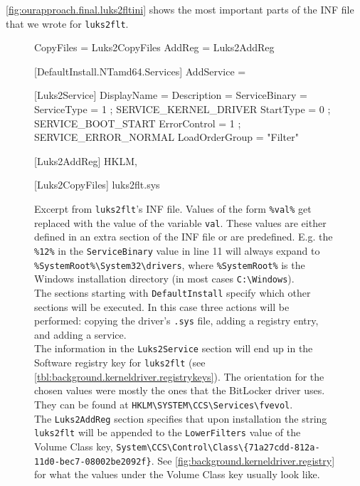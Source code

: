 \autoref{fig:ourapproach.final.luks2fltini} shows the most important parts of the INF file that we wrote for \texttt{luks2flt}.

\begin{figure}[htb!]
	\begin{inicode}
CopyFiles = Luks2CopyFiles
AddReg    = Luks2AddReg

[DefaultInstall.NTamd64.Services]
AddService = %

[Luks2Service]
DisplayName    = %
Description    = %
ServiceBinary  = %
ServiceType    = 1 ; SERVICE_KERNEL_DRIVER
StartType      = 0 ; SERVICE_BOOT_START
ErrorControl   = 1 ; SERVICE_ERROR_NORMAL
LoadOrderGroup = "Filter"

[Luks2AddReg]
HKLM,%

[Luks2CopyFiles]
luks2flt.sys
	\end{inicode}
	\caption[
		Excerpt from \texttt{luks2flt}'s INF file
	]{
		Excerpt from \texttt{luks2flt}'s INF file. Values of the form \texttt{\%val\%} get replaced with the value of the variable \texttt{val}. These values are either defined in an extra section of the INF file or are predefined. E.g. the \texttt{\%12\%} in the \texttt{ServiceBinary} value in line 11 will always expand to \texttt{\%SystemRoot\%\textbackslash System32\textbackslash drivers}, where \texttt{\%SystemRoot\%} is the Windows installation directory (in most cases \texttt{C:\textbackslash Windows}).\\
		The sections starting with \texttt{DefaultInstall} specify which other sections will be executed. In this case three actions will be performed: copying the driver's \texttt{.sys} file, adding a registry entry, and adding a service.\\
		The information in the \texttt{Luks2Service} section will end up in the Software registry key for \texttt{luks2flt} (see \autoref{tbl:background.kerneldriver.registrykeys}). The orientation for the chosen values were mostly the ones that the BitLocker driver uses. They can be found at \texttt{HKLM\textbackslash SYSTEM\textbackslash CCS\textbackslash Services\textbackslash fvevol}.\\
		The \texttt{Luks2AddReg} section specifies that upon installation the string \texttt{luks2flt} will be appended to the \texttt{LowerFilters} value of the Volume Class key, \texttt{System\textbackslash CCS\textbackslash Control\textbackslash Class\textbackslash \{71a27cdd-812a-11d0-bec7-08002be2092f\}}. See \autoref{fig:background.kerneldriver.registry} for what the values under the Volume Class key usually look like.
	}
	\label{fig:ourapproach.final.luks2fltini}
\end{figure}

